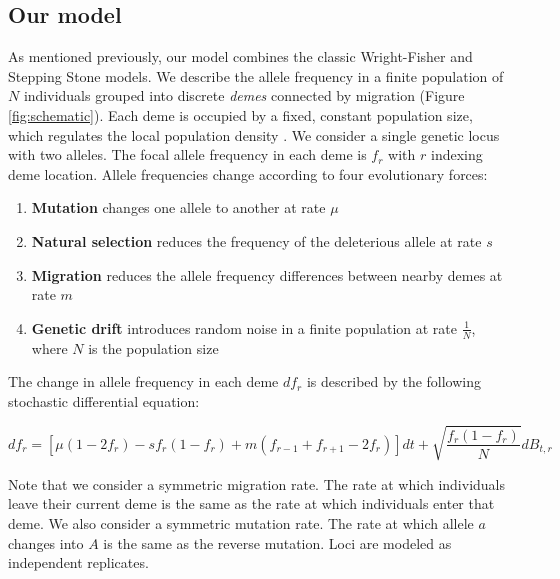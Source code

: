 \subsection{Our model} \label{"section:our_model"}

As mentioned previously, our model combines the classic Wright-Fisher and Stepping Stone models. We describe the allele frequency in a finite population of $N$ individuals grouped into discrete \textit{demes} connected by migration (Figure \ref{fig:schematic}). Each deme is occupied by a fixed, constant population size, which regulates the local population density \cite{felsenstein_pain_1975}. We consider a single genetic locus with two alleles. The focal allele frequency in each deme is $f_r$ with $r$ indexing deme location. Allele frequencies change according to four evolutionary forces:


\begin{enumerate}
    \item \textbf{Mutation} changes one allele to another at rate $\mu$
    \item \textbf{Natural selection} reduces the frequency of the deleterious allele at rate $s$
    \item \textbf{Migration} reduces the allele frequency differences between nearby demes at rate $m$
    \item \textbf{Genetic drift} introduces random noise in a finite population at rate $\frac{1}{N}$, \\ where $N$ is the population size
\end{enumerate}


The change in allele frequency in each deme $df_r$ is described by the following stochastic differential equation:

\begin{equation}
    \label{eq:model}
    df_r=[\mu(1-2f_r)-sf_r (1-f_r ) + m (f_{r-1}+f_{r+1}-2f_r)]dt+\sqrt{\frac{f_r (1-f_r )}{N}} dB_{t,r}
\end{equation}


Note that we consider a symmetric migration rate. The rate at which individuals leave their current deme is the same as the rate at which individuals enter that deme. We also consider a symmetric mutation rate. The rate at which allele $a$ changes into $A$ is the same as the reverse mutation. Loci are modeled as independent replicates.


